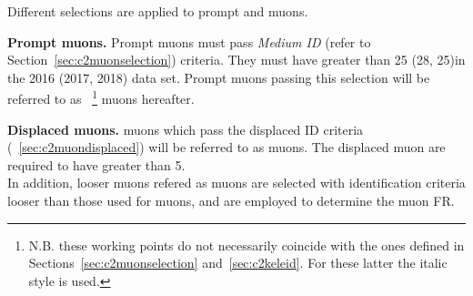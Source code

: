 Different selections are applied to prompt and \displ muons.

\textbf {Prompt muons.}
Prompt muons must pass \emph{Medium ID} (refer
to Section~\ref{sec:c2muonselection}) criteria. They must have \pt greater than
25 (28, 25)\GeV in the 2016 (2017, 2018) data set.
Prompt muons passing this selection will be referred to as \tP~\footnote{
N.B. these working points do not necessarily coincide with the ones
defined in Sections~\ref{sec:c2muonselection}
and~\ref{sec:c2keleid}. For these latter the italic style is used.} muons hereafter.

\textbf {Displaced muons.}
\Displ muons which pass the displaced ID criteria
(~\ref{sec:c2muondisplaced}) will be referred to as \tD
muons. The displaced muon are required to have \pt greater than 5\GeV.\\
In addition, looser muons refered as \fo muons are selected
with identification criteria looser than those used for \tD muons, and are employed to determine the muon FR.

